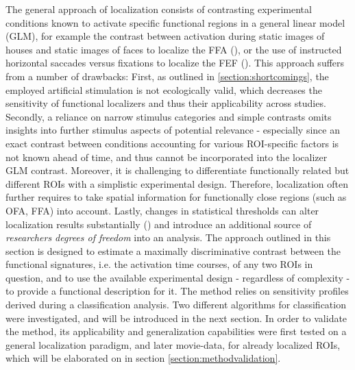 \documentclass[a4paper, 12pt]{scrreprt}
\begin{document}
The general approach of localization consists of contrasting experimental conditions known to activate specific functional regions in a general linear model (GLM), for example the contrast between activation during static images of houses and static images of faces to localize the FFA (\cite{fox2009defining}), or the use of instructed horizontal saccades versus fixations to localize the FEF (\cite{connolly2002human}). This approach suffers from a number of drawbacks: \newline
First, as outlined in \ref{section:shortcomings}, the employed artificial stimulation is not ecologically valid, which decreases the sensitivity of functional localizers and thus their applicability across studies. Secondly, a reliance on narrow stimulus categories and simple contrasts omits insights into further stimulus aspects of potential relevance - especially since an exact contrast between conditions accounting for various ROI-specific factors is not known ahead of time, and thus cannot be incorporated into the localizer GLM contrast. Moreover, it is challenging to differentiate functionally related but different ROIs with a simplistic experimental design. Therefore, localization often further requires to take spatial information for functionally close regions (such as OFA, FFA) into account.
Lastly, changes in statistical thresholds can alter localization results substantially (\cite{fox2009defining}) and introduce an additional source of \textit{researchers degrees of freedom} into an analysis.\newline
The approach outlined in this section is designed to estimate a maximally discriminative contrast between the functional signatures, i.e. the activation time courses, of any two ROIs in question, and to use the available experimental design - regardless of complexity - to provide a functional description for it.\newline
The method relies on sensitivity profiles derived during a classification analysis. Two different algorithms for classification were investigated, and will be introduced in the next section. In order to validate the method, its applicability and generalization capabilities were first tested on a general localization paradigm, and later movie-data, for already localized ROIs, which will be elaborated on in section \ref{section:methodvalidation}.
\end{document}
